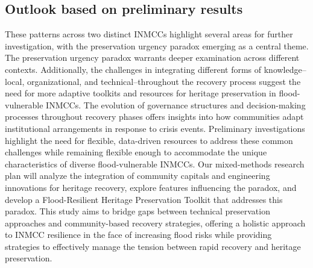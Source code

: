 \documentclass[11pt]{article}
\begin{document}
\subsection{Outlook based on preliminary results}
These patterns across two distinct INMCCs highlight several areas for further investigation, with the preservation urgency paradox emerging as a central theme. 
The preservation urgency paradox warrants deeper examination across different contexts. 
Additionally, the challenges in integrating different forms of knowledge--local, organizational, and technical--throughout the recovery process suggest the need for more adaptive toolkits and resources for heritage preservation in flood-vulnerable INMCCs. 
The evolution of governance structures and decision-making processes throughout recovery phases offers insights into how communities adapt institutional arrangements in response to crisis events.
Preliminary investigations highlight the need for flexible, data-driven resources to address these common challenges while remaining flexible enough to accommodate the unique characteristics of diverse flood-vulnerable INMCCs.
Our mixed-methods research plan will analyze the integration of community capitals and engineering innovations for heritage recovery, explore features influencing the paradox, and develop a Flood-Resilient Heritage Preservation Toolkit that addresses this paradox. 
This study aims to bridge gaps between technical preservation approaches and community-based recovery strategies, offering a holistic approach to INMCC resilience in the face of increasing flood risks while providing strategies to effectively manage the tension between rapid recovery and heritage preservation.

\vspace{-10pt}
\end{document}
